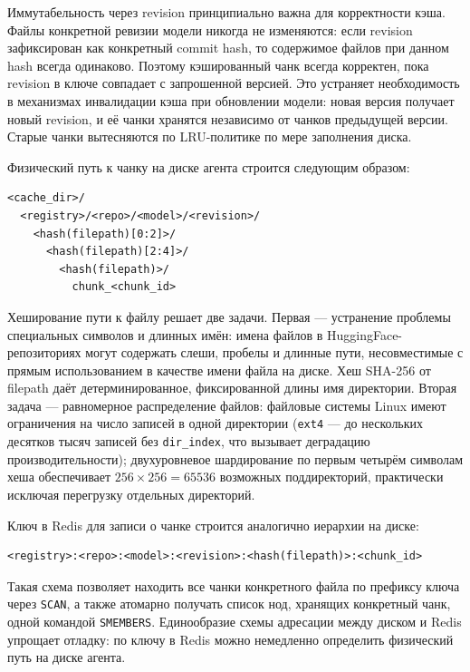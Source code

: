 Иммутабельность через revision принципиально важна для корректности кэша. Файлы конкретной ревизии модели никогда не изменяются: если revision зафиксирован как конкретный commit hash, то содержимое файлов при данном hash всегда одинаково. Поэтому кэшированный чанк всегда корректен, пока revision в ключе совпадает с запрошенной версией. Это устраняет необходимость в механизмах инвалидации кэша при обновлении модели: новая версия получает новый revision, и её чанки хранятся независимо от чанков предыдущей версии. Старые чанки вытесняются по LRU-политике по мере заполнения диска.

Физический путь к чанку на диске агента строится следующим образом:

\begin{lstlisting}[numbers=none,frame=none,basicstyle=\small\ttfamily]
<cache_dir>/
  <registry>/<repo>/<model>/<revision>/
    <hash(filepath)[0:2]>/
      <hash(filepath)[2:4]>/
        <hash(filepath)>/
          chunk_<chunk_id>
\end{lstlisting}

Хеширование пути к файлу решает две задачи. Первая --- устранение проблемы специальных символов и длинных имён: имена файлов в HuggingFace-репозиториях могут содержать слеши, пробелы и длинные пути, несовместимые с прямым использованием в качестве имени файла на диске. Хеш SHA-256 от filepath даёт детерминированное, фиксированной длины имя директории. Вторая задача --- равномерное распределение файлов: файловые системы Linux имеют ограничения на число записей в одной директории (\texttt{ext4} --- до нескольких десятков тысяч записей без \texttt{dir\_index}, что вызывает деградацию производительности); двухуровневое шардирование по первым четырём символам хеша обеспечивает $256 \times 256 = 65536$ возможных поддиректорий, практически исключая перегрузку отдельных директорий.

Ключ в Redis для записи о чанке строится аналогично иерархии на диске:

\begin{lstlisting}[numbers=none,frame=none,basicstyle=\small\ttfamily]
<registry>:<repo>:<model>:<revision>:<hash(filepath)>:<chunk_id>
\end{lstlisting}

Такая схема позволяет находить все чанки конкретного файла по префиксу ключа через \texttt{SCAN}, а также атомарно получать список нод, хранящих конкретный чанк, одной командой \texttt{SMEMBERS}. Единообразие схемы адресации между диском и Redis упрощает отладку: по ключу в Redis можно немедленно определить физический путь на диске агента.

